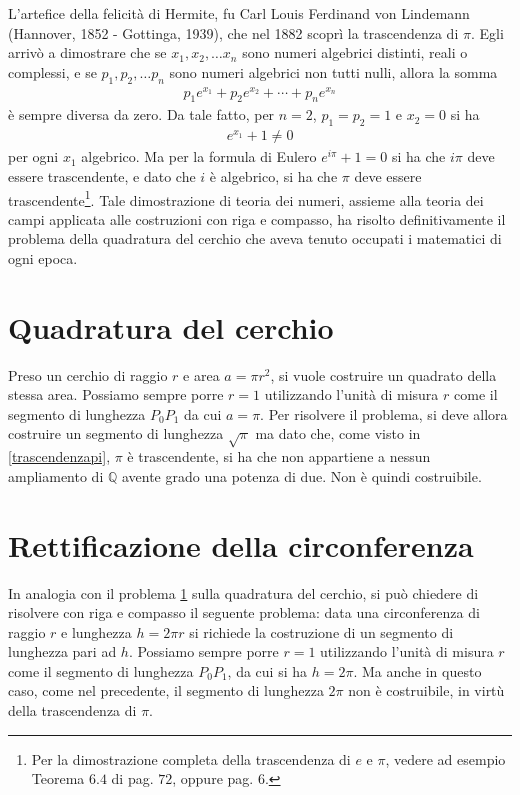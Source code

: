 L'artefice della felicità di Hermite, fu Carl Louis Ferdinand von Lindemann (Hannover, 1852 - Gottinga, 1939), che nel 1882 scoprì la trascendenza di $\pi$. Egli arrivò a dimostrare che se $x_1, x_2, \dots x_n$ sono numeri algebrici distinti, reali o complessi, e se $p_1, p_2, \dots p_n$ sono numeri algebrici non tutti nulli, allora la somma
\begin{align*}
p_1 e^{x_1} + p_2 e^{x_2} + \cdots + p_n e^{x_n}  
\end{align*}
\noindent
è sempre diversa da zero. Da tale fatto, per $n = 2$, $p_1 = p_2 = 1$ e $x_2 = 0$ si ha 
\begin{align*}
e^{x_1} + 1 \neq 0  
\end{align*}
\noindent
per ogni $x_1$ algebrico. Ma per la formula di Eulero $e^{i\pi} + 1 = 0$ si ha che $i\pi$ deve essere trascendente, e dato che $i$ è algebrico, si ha che $\pi$ deve essere trascendente\footnote{Per la dimostrazione completa della trascendenza di $e$ e $\pi$, vedere ad esempio \cite{Stewart} Teorema $6.4$ di pag. $72$, oppure \cite{Baker} pag. $6$. }.
Tale dimostrazione di teoria dei numeri, assieme alla teoria dei campi applicata alle costruzioni con riga e compasso, ha risolto definitivamente il problema della quadratura del cerchio che aveva tenuto occupati i matematici di ogni epoca.

\section{Quadratura del cerchio} \label{quadratura}
Preso un cerchio di raggio $r$ e area $a = \pi r^2$, si vuole costruire un quadrato della stessa area. Possiamo sempre porre $r = 1$ utilizzando l'unità di misura $r$ come il segmento di lunghezza $P_0 P_1$ da cui $a = \pi$. Per risolvere il problema, si deve allora costruire un segmento di lunghezza $\sqrt{\pi}$ ma dato che, come visto in \ref{trascendenzapi}, $\pi$ è trascendente, si ha che non appartiene a nessun ampliamento di $\mathbb{Q}$ avente grado una potenza di due. Non è quindi costruibile.

\section{Rettificazione della circonferenza}
In analogia con il problema \ref{quadratura} sulla quadratura del cerchio, si può chiedere di risolvere con riga e compasso il seguente problema: data una circonferenza di raggio $r$ e lunghezza $h = 2\pi r$ si richiede la costruzione di un segmento di lunghezza pari ad $h$. Possiamo sempre porre $r = 1$ utilizzando l'unità di misura $r$ come il segmento di lunghezza $P_0 P_1$, da cui si ha $h = 2\pi$. Ma anche in questo caso, come nel precedente, il segmento di lunghezza $2\pi$ non è costruibile, in virtù della trascendenza di $\pi$.












